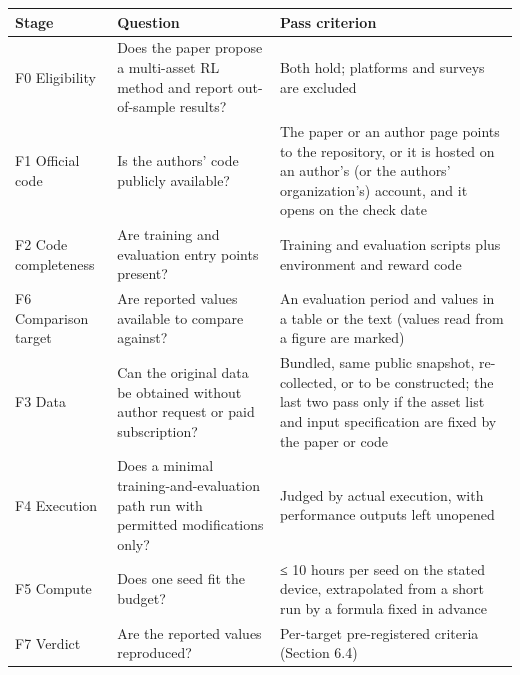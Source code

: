 \documentclass[12pt,a4paper]{report}
\begin{document}
{\small
\begin{longtable}[]{@{}
  >{\raggedright\arraybackslash}p{}
  >{\raggedright\arraybackslash}p{}
  >{\raggedright\arraybackslash}p{}@{}}
\toprule\noalign{}
\begin{minipage}[b]{\linewidth}\raggedright
Stage
\end{minipage} & \begin{minipage}[b]{\linewidth}\raggedright
Question
\end{minipage} & \begin{minipage}[b]{\linewidth}\raggedright
Pass criterion
\end{minipage} \\
\midrule\noalign{}
\endhead
\bottomrule\noalign{}
\endlastfoot
F0 Eligibility & Does the paper propose a multi-asset RL method and
report out-of-sample results? & Both hold; platforms and surveys are
excluded \\
F1 Official code & Is the authors' code publicly available? & The paper
or an author page points to the repository, or it is hosted on an
author's (or the authors' organization's) account, and it opens on the
check date \\
F2 Code completeness & Are training and evaluation entry points present?
& Training and evaluation scripts plus environment and reward code \\
F6 Comparison target & Are reported values available to compare against?
& An evaluation period and values in a table or the text (values read
from a figure are marked) \\
F3 Data & Can the original data be obtained without author request or
paid subscription? & Bundled, same public snapshot, re-collected, or to
be constructed; the last two pass only if the asset list and input
specification are fixed by the paper or code \\
F4 Execution & Does a minimal training-and-evaluation path run with
permitted modifications only? & Judged by actual execution, with
performance outputs left unopened \\
F5 Compute & Does one seed fit the budget? & ≤ 10 hours per seed on the
stated device, extrapolated from a short run by a formula fixed in
advance \\
F7 Verdict & Are the reported values reproduced? & Per-target
pre-registered criteria (Section 6.4) \\
\end{longtable}
}
\end{document}
